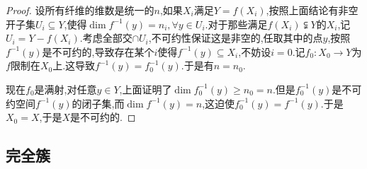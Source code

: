 \begin{enumerate}
\begin{proof}
    	\qquad
    	
    	设所有纤维的维数是统一的$n$,如果$X_i$满足$Y=f(X_i)$,按照上面结论有非空开子集$U_i\subseteq Y$,使得$\dim f^{-1}(y)=n_i,\forall y\in U_i$.对于那些满足$f(X_i)\subsetneqq Y$的$X_i$,记$U_i=Y-f(X_i)$.考虑全部交$\cap U_i$,不可约性保证这是非空的,任取其中的点$y$,按照$f^{-1}(y)$是不可约的,导致存在某个$i$使得$f^{-1}(y)\subseteq X_i$,不妨设$i=0$.记$f_0:X_0\to Y$为$f$限制在$X_0$上.这导致$f^{-1}(y)=f_0^{-1}(y)$.于是有$n=n_0$.
    	
    	\qquad
    	
    	现在$f_0$是满射,对任意$y\in Y$,上面证明了$\dim f_0^{-1}(y)\ge n_0=n$.但是$f_0^{-1}(y)$是不可约空间$f^{-1}(y)$的闭子集,而$\dim f^{-1}(y)=n$,这迫使$f_0^{-1}(y)=f^{-1}(y)$.于是$X_0=X$,于是$X$是不可约的.
    \end{proof}
\end{enumerate}
\subsection{完全簇}

